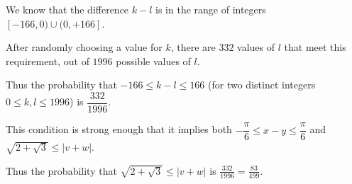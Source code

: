 We know that the difference $k - l$ is in the range of integers $[-166, 0) \cup (0, +166]$.

After randomly choosing a value for $k$, there are $332$ values of $l$ that meet this requirement, out of $1996$ possible values of $l$.

Thus the probability that $-166 \leq k - l \leq 166$ (for two distinct integers $0 \leq k, l \leq 1996$) is $\dfrac{332}{1996}$.

This condition is strong enough that it implies both $-\dfrac{\pi}{6} \leq x - y \leq \dfrac{\pi}{6}$ and $\sqrt{2 + \sqrt 3} \leq |v + w|$.

Thus the probability that $\sqrt{2 + \sqrt 3} \leq |v + w|$ is $\boxed{\frac{332}{1996} = \frac{83}{499}}$.
